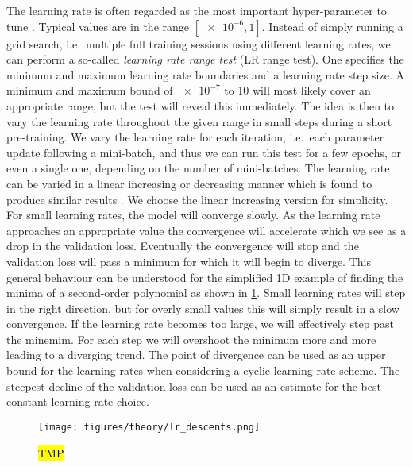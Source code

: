 The learning rate is often regarded as the most important hyper-parameter to
tune \cite{Bengio2012}. Typical values are in the range $[\num{e-6}, 1]$.
Instead of simply running a grid search, i.e.\ multiple full training sessions
using different learning rates, we can perform a so-called \textit{learning rate
range test} (LR range test). One specifies the minimum and maximum learning rate
boundaries and a learning rate step size. A minimum and maximum bound of
$\num{e-7}$ to 10 will most likely cover an appropriate range, but the test will
reveal this immediately. The idea is then to vary the learning rate throughout
the given range in small steps during a short pre-training. We vary the learning
rate for each iteration, i.e.\ each parameter update following a mini-batch, and
thus we can run this test for a few epochs, or even a single one, depending on
the number of mini-batches. The learning rate can be varied in a linear
increasing or decreasing manner which is found to produce similar results
\cite{smith2017cyclical}. We choose the linear increasing version for
simplicity. For small learning rates, the model will converge slowly. As the
learning rate approaches an appropriate value the convergence will accelerate
which we see as a drop in the validation loss. Eventually the convergence will
stop and the validation loss will pass a minimum for which it will begin to
diverge. This general behaviour can be understood for the simplified 1D example
of finding the minima of a second-order polynomial as shown in
\cref{fig:lr_descents}. Small learning rates will step in the right direction,
but for overly small values this will simply result in a slow convergence. If
the learning rate becomes too large, we will effectively step past the minemim.
For each step we will overshoot the minimum more and more leading to a diverging
trend. The point of divergence can be used as an upper bound for the learning
rates when considering a cyclic learning rate scheme.  The steepest
decline of the validation loss can be used as an estimate for the best constant
learning rate choice. 


\begin{figure}[H]
  \centering
  \texttt{[image: figures/theory/lr\_descents.png]}
  \caption{\hl{TMP}  }
  \label{fig:lr_descents}
\end{figure}


